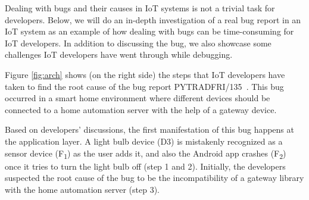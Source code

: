 
Dealing with bugs and their causes in IoT systems is not a trivial task for developers. Below, we will do an in-depth investigation of a real bug report in an IoT system as an example of how dealing with bugs can be time-consuming for IoT developers. In addition to discussing the bug, we also showcase some challenges IoT developers have went through while debugging. 

Figure \ref{fig:arch} shows (on the right side) the steps that IoT developers have taken to find the root cause of the bug report PYTRADFRI/135~\cite{iotbug:290}. This bug occurred in a smart home environment where different devices should be connected to a home automation server with the help of a gateway device.


Based on developers' discussions, the first manifestation of this bug happens at the application layer. A light bulb device (D3) is mistakenly recognized as a sensor device (F\textsubscript{1}) as the user adds it, and also the Android app crashes (F\textsubscript{2}) once it tries to turn the light bulb off (step 1 and 2). Initially, the developers suspected the root cause of the bug to be the incompatibility of a gateway library with the home automation server (step 3).


